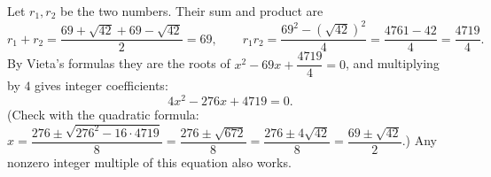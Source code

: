Let $r_1,r_2$ be the two numbers. Their sum and product are
\[r_1+r_2=\dfrac{69+\sqrt{42}+69-\sqrt{42}}{2}=69,\qquad r_1r_2=\dfrac{69^2-\left(\sqrt{42}\right)^2}{4}=\dfrac{4761-42}{4}=\dfrac{4719}{4}.\]
By Vieta's formulas they are the roots of $x^2-69x+\dfrac{4719}{4}=0$, and multiplying by $4$ gives integer coefficients:
\[\boxed{4x^2-276x+4719=0}.\]
(Check with the quadratic formula: $x=\dfrac{276\pm\sqrt{276^2-16\cdot4719}}{8}=\dfrac{276\pm\sqrt{672}}{8}=\dfrac{276\pm4\sqrt{42}}{8}=\dfrac{69\pm\sqrt{42}}{2}$.) Any nonzero integer multiple of this equation also works.
